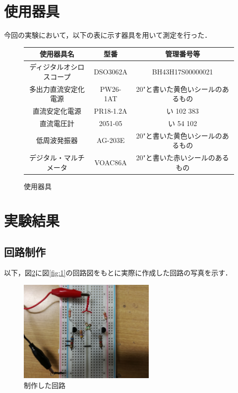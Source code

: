 \documentclass[10pt, a4j, dvipdfmx]{jarticle}
\makeatletter
\newcommand{\tblcaption}[1]{\def\@captype{table}\caption{#1}}
\makeatother
\begin{document}
    \section{使用器具}
    今回の実験において，以下の表に示す器具を用いて測定を行った．
    \begin{figure}[H]
        \centering
        \tblcaption{使用器具}
        \label{tbl:使用器具}
        \begin{tabular}{|c|c|c|}\hline
            使用器具名 & 型番 & 管理番号等 \\\hline
            ディジタルオシロスコープ & DSO3062A & BH43H17S00000021 \\\hline
            多出力直流安定化電源 & PW26-1AT & 20"と書いた黄色いシールのあるもの \\\hline
            直流安定化電源 & PR18-1.2A & い 102 383 \\\hline
            直流電圧計 & 2051-05 & い 54 102 \\\hline
            低周波発振器 & AG-203E & 20"と書いた黄色いシールのあるもの \\\hline
            デジタル・マルチメータ & VOAC86A & 20"と書いた赤いシールのあるもの \\\hline
        \end{tabular}
    \end{figure}

    \newpage
    \section{実験結果}
    \subsection{回路制作}
    以下，図\ref{fig:ex-1}に図\ref{fig:1}の回路図をもとに実際に作成した回路の写真を示す．
    \begin{figure}[H]
        \centering
        \includegraphics[height=50mm]{images/ex-1.jpg}
        \caption{制作した回路}
        \label{fig:ex-1}
    \end{figure}
\end{document}
